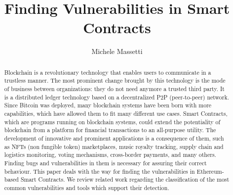 \documentclass[a4paper,sigconf, language=french,
language=german, language=spanish, language=english]{acmart}
\begin{document}
\title{Finding Vulnerabilities in Smart Contracts}


\author{Michele Massetti}

\renewcommand{\shortauthors}{Massetti.}

\begin{abstract}
Blockchain is a revolutionary technology that enables users to communicate in a trustless manner. 
The most prominent change brought by this technology is the mode of business between organizations: they do not need anymore a trusted third party. 
It is a distributed ledger technology based on a decentralized P2P (peer-to-peer) network. 
Since Bitcoin was deployed, many blockchain systems have been born with more capabilities, which have allowed them to fit many
different use cases. Smart Contracts, which are programs running on blockchain systems, could extend the potentiality of blockchain
from a platform for financial transactions to an all-purpose utility.
The development of innovative and prominent applications is a consequence of them, such as NFTs (non fungible token) marketplaces, music royalty tracking, supply chain and logistics monitoring, voting mechanisms, 
cross-border payments, and many others.
Finding bugs and vulnerabilities in them is necessary for assuring their correct behaviour. 
This paper deals with the way for finding the vulnerabilities in Ethereum-based Smart Contracts. We review related work regarding 
the classification of the most common vulnerabilities and tools which support their detection.
\end{abstract}
\end{document}
